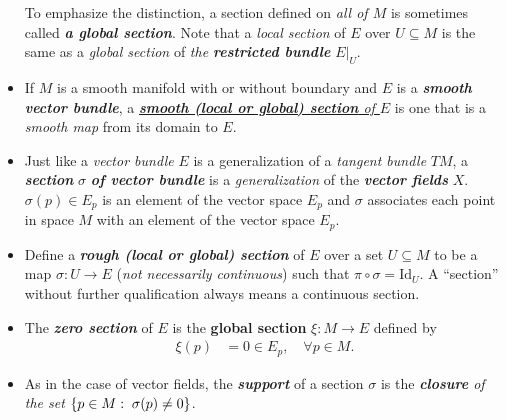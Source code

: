 \documentclass[11pt]{article}
\begin{document}
\begin{itemize}
\begin{definition}
To emphasize the distinction, a section defined on \emph{all of $M$} is sometimes called \emph{\textbf{a global section}}. Note that a \emph{local section} of $E$ over $U \subseteq  M$ is the same as a \emph{global section} of \emph{the \textbf{restricted bundle}} $E|_{U}$.
\end{definition}


\item \begin{definition}
If $M$ is a smooth manifold with or without boundary and $E$ is a \emph{\textbf{smooth vector bundle}}, a \underline{\emph{\textbf{smooth (local or global) section} of $E$}} is one that is a
\emph{smooth map} from its domain to $E$.
\end{definition}

\item \begin{remark}
Just like a \emph{vector bundle} $E$ is a generalization of a \emph{tangent bundle} $TM$, a \emph{\textbf{section}} $\sigma$ \emph{\textbf{of vector bundle}} is a \emph{generalization} of the \emph{\textbf{vector fields}} $X$. $\sigma(p) \in E_p$ is an element of the vector space $E_p$ and $\sigma$ associates  each point in space $M$ with an element of the vector space $E_p$.
\end{remark}

\item \begin{definition}
Define a \emph{\textbf{rough (local or global) section}} of $E$ over a set $U \subseteq M$ to be a map $\sigma: U \rightarrow E$ (\textit{not necessarily continuous}) such that  $\pi \circ \sigma =  \text{Id}_U$. A ``section” without further qualification always means a continuous section.
\end{definition}

\item \begin{definition}
The \emph{\textbf{zero section}} of $E$ is the \textbf{global section} $\xi: M \rightarrow E$ defined by
\begin{align*}
\xi(p) &= 0 \in E_{p}, \quad \forall p \in M.
\end{align*}
\end{definition}

\item \begin{definition}
As in the case of vector fields, the \emph{\textbf{support}} of a section $\sigma$ is the \emph{\textbf{closure} of the set} $\left\{p \in M:\;  \sigma(p) \neq 0\right\}$.
\end{definition}


\end{itemize}
\end{document}

